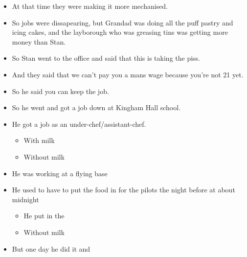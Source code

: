 \documentclass[10pt,twocolumn,letterpaper]{article}
\begin{document}
\begin{itemize}
    \item At that time they were making it more mechanised.
    \item So jobs were dissapearing, but Grandad was doing all the puff pastry and icing cakes, and the layborough who was greasing tins was getting more money than Stan.
    \item So Stan went to the office and said that this is taking the piss.
    \item And they said that we can't pay you a mans wage because you're not 21 yet.
    \item So he said you can keep the job.
    \item So he went and got a job down at Kingham Hall school.
    \item He got a job as an under-chef/assistant-chef.
    \begin{itemize}
        \item With milk
        \item Without milk
    \end{itemize}
    \item He was working at a flying base 
    \item He used to have to put the food in for the pilots the night before at about midnight
    \begin{itemize}
        \item He put in the 
        \item Without milk
    \end{itemize}
    \item But one day he did it and 
\end{itemize}
\end{document}
